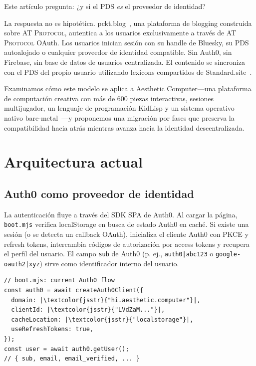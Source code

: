 \documentclass[10pt,letterpaper,twocolumn]{article}
\newcommand{\atproto}{\textsc{AT Protocol}}
\begin{document}
Este artículo pregunta: ¿y si el PDS \emph{es} el proveedor de identidad?

La respuesta no es hipotética. pckt.blog~\citep{pcktblog2025}, una plataforma de blogging construida sobre \atproto{}, autentica a los usuarios exclusivamente a través de \atproto{} OAuth. Los usuarios inician sesión con su handle de Bluesky, su PDS autoalojado o cualquier proveedor de identidad compatible. Sin Auth0, sin Firebase, sin base de datos de usuarios centralizada. El contenido se sincroniza con el PDS del propio usuario utilizando lexicons compartidos de Standard.site~\citep{standardsite2025}.

Examinamos cómo este modelo se aplica a Aesthetic Computer---una plataforma de computación creativa con más de 600 piezas interactivas, sesiones multijugador, un lenguaje de programación KidLisp y un sistema operativo nativo bare-metal~\citep{scudder2026os}---y proponemos una migración por fases que preserva la compatibilidad hacia atrás mientras avanza hacia la identidad descentralizada.


\section{Arquitectura actual}
\label{sec:current}

\subsection{Auth0 como proveedor de identidad}

La autenticación fluye a través del SDK SPA de Auth0. Al cargar la página, \texttt{boot.mjs} verifica localStorage en busca de estado Auth0 en caché. Si existe una sesión (o se detecta un callback OAuth), inicializa el cliente Auth0 con PKCE y refresh tokens, intercambia códigos de autorización por access tokens y recupera el perfil del usuario. El campo \texttt{sub} de Auth0 (p. ej., \texttt{auth0|abc123} o \texttt{google-oauth2|xyz}) sirve como identificador interno del usuario.

\begin{lstlisting}[style=acjsstyle]
// boot.mjs: current Auth0 flow
const auth0 = await createAuth0Client({
  domain: |\textcolor{jsstr}{"hi.aesthetic.computer"}|,
  clientId: |\textcolor{jsstr}{"LVdZaM..."}|,
  cacheLocation: |\textcolor{jsstr}{"localstorage"}|,
  useRefreshTokens: true,
});
const user = await auth0.getUser();
// { sub, email, email_verified, ... }
\end{lstlisting}
\end{document}
